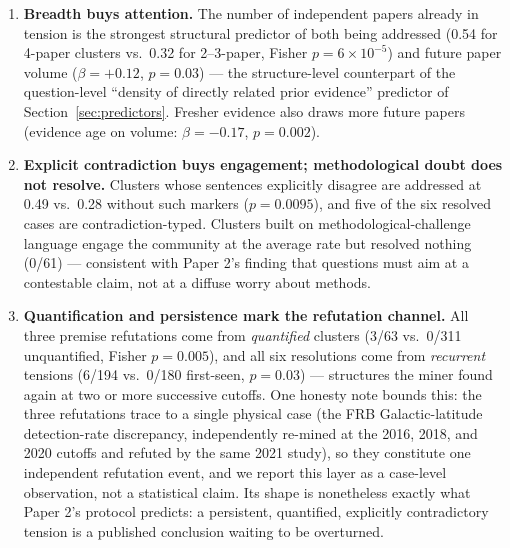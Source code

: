 \documentclass[11pt]{article}
\begin{document}
\begin{enumerate}
  \item \textbf{Breadth buys attention.} The number of independent
    papers already in tension is the strongest structural predictor of
    both being addressed (0.54 for 4-paper clusters vs.\ 0.32 for
    2--3-paper, Fisher $p=6\times10^{-5}$) and future paper volume
    ($\beta=+0.12$, $p=0.03$) --- the structure-level counterpart of
    the question-level ``density of directly related prior evidence''
    predictor of Section~\ref{sec:predictors}. Fresher evidence also draws more future
    papers (evidence age on volume: $\beta=-0.17$, $p=0.002$).
  \item \textbf{Explicit contradiction buys engagement; methodological
    doubt does not resolve.} Clusters whose sentences explicitly
    disagree are addressed at 0.49 vs.\ 0.28 without such markers
    ($p=0.0095$), and five of the six resolved cases are
    contradiction-typed. Clusters built on methodological-challenge
    language engage the community at the average rate but resolved
    nothing (0/61) --- consistent with Paper 2's finding that questions
    must aim at a contestable claim, not at a diffuse worry about
    methods.
  \item \textbf{Quantification and persistence mark the refutation
    channel.} All three premise refutations come from
    \emph{quantified} clusters (3/63 vs.\ 0/311 unquantified, Fisher
    $p=0.005$), and all six resolutions come from \emph{recurrent}
    tensions (6/194 vs.\ 0/180 first-seen, $p=0.03$) --- structures the
    miner found again at two or more successive cutoffs. One honesty
    note bounds this: the three refutations trace to a single physical
    case (the FRB Galactic-latitude detection-rate discrepancy,
    independently re-mined at the 2016, 2018, and 2020 cutoffs and
    refuted by the same 2021 study), so they constitute one independent
    refutation event, and we report this layer as a case-level
    observation, not a statistical claim. Its shape is nonetheless
    exactly what Paper 2's protocol predicts: a persistent, quantified,
    explicitly contradictory tension is a published conclusion waiting
    to be overturned.
\end{enumerate}
\end{document}
